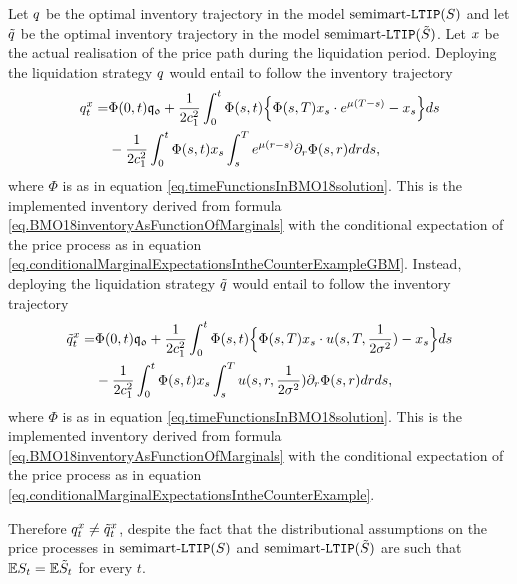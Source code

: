 \documentclass[10pt,a4paper]{article}
\begin{document}
\begin{example}
		Let $q$ be the optimal inventory trajectory in the model $\text{semimart-}\mathtt{LTIP}(S)$ and let $\tilde{q}$ be the optimal inventory trajectory in the model $\text{semimart-}\mathtt{LTIP}(\tilde{S})$. Let $x$ be the actual realisation of the price path during the liquidation period. Deploying the liquidation strategy $q$ would entail to follow the inventory trajectory 
		\begin{equation*}
		\begin{split}
		q^{x}_t =& \Phi(0,t)\mathfrak{q_0} + \frac{1}{2c_{1}^{2}} \int_{0}^{t} \Phi(s,t)
		\Big\lbrace
		\Phi(s,T) x_s \cdot e^{\mu(T-s)} - x_s
		\Big\rbrace ds \\
		& - 
		\frac{1}{2c_{1}^{2}} \int_{0}^{t} \Phi(s,t)
		 x_s \int_{s}^{T}  e^{\mu(r-s)} \partial_r \Phi(s,r)dr ds,
		\end{split}
		\end{equation*}
		where $\Phi$ is as in equation \eqref{eq.timeFunctionsInBMO18solution}.
		This is the implemented inventory derived from formula  \eqref{eq.BMO18inventoryAsFunctionOfMarginals} with the conditional expectation of the price process as in equation \eqref{eq.conditionalMarginalExpectationsIntheCounterExampleGBM}. Instead, deploying the liquidation strategy $\tilde{q}$ would entail to follow the inventory trajectory 
		\begin{equation*}
		\begin{split}
		\tilde{q}^{x}_t =& \Phi(0,t)\mathfrak{q_0} + \frac{1}{2c_{1}^{2}} \int_{0}^{t} \Phi(s,t)
		\Big\lbrace
		\Phi(s,T) x_s \cdot u(s,T,\frac{1}{2\sigma^{2}}) - x_s
		\Big\rbrace ds \\
		& - 
		\frac{1}{2c_{1}^{2}} \int_{0}^{t} \Phi(s,t)
		 x_s\int_{s}^{T}u(s,r,\frac{1}{2\sigma^{2}}) \partial_r \Phi(s,r)dr ds,
		\end{split}
		\end{equation*}
			where $\Phi$ is as in equation \eqref{eq.timeFunctionsInBMO18solution}.
		This is the  implemented inventory derived from formula  \eqref{eq.BMO18inventoryAsFunctionOfMarginals} with the conditional expectation of the price process as in equation \eqref{eq.conditionalMarginalExpectationsIntheCounterExample}.
		
		Therefore $	q^{x}_t \neq\tilde{q}^{x}_t$, despite the fact that the distributional assumptions on the price processes in $\text{semimart-}\mathtt{LTIP}(S)$ and $\text{semimart-}\mathtt{LTIP}(\tilde{S})$ are such that $\mathbb{{E}} S_t  = \mathbb{{E}} \tilde{S}_t$ for every $t$. 
		
	\end{example}
\end{document}
